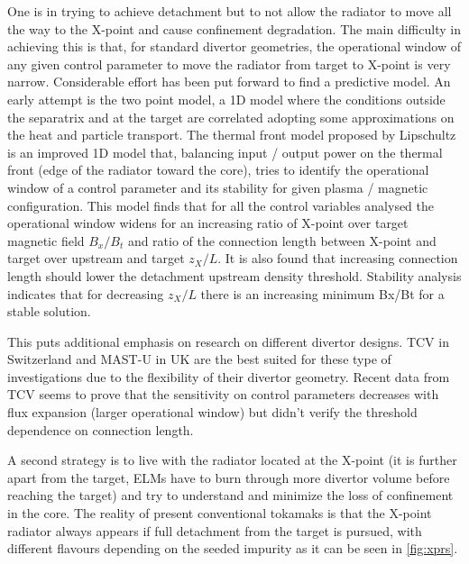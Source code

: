 One is in trying to achieve detachment but to not allow the radiator to move all the way to the X-point and cause confinement degradation. The main difficulty in achieving this is that, for standard divertor geometries, the operational window of any given control parameter to move the radiator from target to X-point is very narrow. Considerable effort has been put forward to find a predictive model. An early attempt is the two point model, a 1D model where the conditions outside the separatrix and at the target are correlated adopting some approximations on the heat and particle transport.\cite{HOBBS1966,Hobbs1967,Mahdavi1981,Keilhacker1982,Harbour1984,Lackner1984,Stangeby2001} The thermal front model proposed by Lipschultz \cite{Lipschultz2016} is an improved 1D model that, balancing input / output power on the thermal front (edge of the radiator toward the core), tries to identify the operational window of a control parameter and its stability for given plasma / magnetic configuration. This model finds that for all the control variables analysed the operational window widens for an increasing ratio of X-point over target magnetic field $B_x/B_t$ and ratio of the connection length between X-point and target over upstream and target $z_X/L$. It is also found that increasing connection length should lower the detachment upstream density threshold. Stability analysis indicates that for decreasing $z_X/L$ there is an increasing minimum Bx/Bt for a stable solution.\cite{Lipschultz2016}

This puts additional emphasis on research on different divertor designs. TCV in Switzerland and MAST-U in UK are the best suited for these type of investigations due to the flexibility of their divertor geometry. Recent data from TCV seems to prove that the sensitivity on control parameters decreases with flux expansion (larger operational window) but didn’t verify the threshold dependence on connection length. \cite{Theiler2017}

A second strategy is to live with the radiator located at the X-point (it is further apart from the target, ELMs have to burn through more divertor volume before reaching the target) and try to understand and minimize the loss of confinement in the core. The reality of present conventional tokamaks is that the X-point radiator always appears if full detachment from the target is pursued, with different flavours depending on the seeded impurity as it can be seen in \autoref{fig:xprs}.

